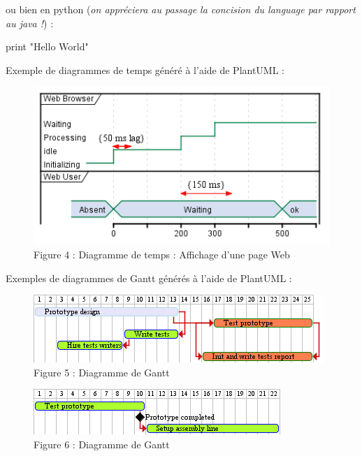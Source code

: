 \documentclass[
  10pt,
]{book}
\newenvironment{Shaded}{}{}
\newcommand{\BuiltInTok}[1]{#1}
\newcommand{\StringTok}[1]{\textcolor[rgb]{0.25,0.44,0.63}{#1}}
\begin{document}
ou bien en python (\emph{on appréciera au passage la concision du
language par rapport au java !}) :

\begin{Shaded}
\begin{Highlighting}[]
\BuiltInTok{print} \StringTok{"Hello World"}
\end{Highlighting}
\end{Shaded}

Exemple de diagrammes de temps généré à l'aide de PlantUML :

\begin{figure}
\centering
\includegraphics{./tex2pdf.-1f50f5654d7493c4/3351154ec6feb4aecc4c725551dd76f7f033eea2.png}
\caption{Figure 4 : Diagramme de temps : Affichage d'une page Web}
\end{figure}

Exemples de diagrammes de Gantt générés à l'aide de PlantUML :

\begin{figure}
\centering
\includegraphics{./tex2pdf.-1f50f5654d7493c4/51a23f36ae650b0334f0669a62cba3804f07b496.png}
\caption{Figure 5 : Diagramme de Gantt}
\end{figure}

\begin{figure}
\centering
\includegraphics{./tex2pdf.-1f50f5654d7493c4/923da1012067e6567c647e5d67f74b2dda84906a.png}
\caption{Figure 6 : Diagramme de Gantt}
\end{figure}
\end{document}
